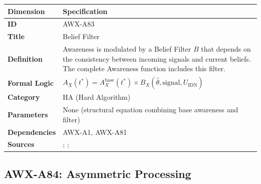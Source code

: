 \begin{table}[htbp]
\small
\begin{tabular}{p{3cm}p{11cm}}
\toprule
\textbf{Dimension} & \textbf{Specification} \\
\midrule
\textbf{ID} & AWX-A83 \\
\textbf{Title} & Belief Filter \\
\textbf{Definition} & Awareness is modulated by a Belief Filter $B$ that depends on the consistency between incoming signals and current beliefs. The complete Awareness function includes this filter. \\
\textbf{Formal Logic} & $A_X(t^*) = A^{\text{base}}_X(t^*) \times B_X(\hat{\theta}, \text{signal}, U_{\text{IDN}})$ \\
\textbf{Category} & HA (Hard Algorithm) \\
\textbf{Parameters} & None (structural equation combining base awareness and filter) \\
\textbf{Dependencies} & AWX-A1, AWX-A81 \\
\textbf{Sources} & \citet{benabou2016mindful}; \citet{kunda1990case}; \citet{lord1979biased} \\
\bottomrule
\end{tabular}
\end{table}


\subsection{AWX-A84: Asymmetric Processing}

